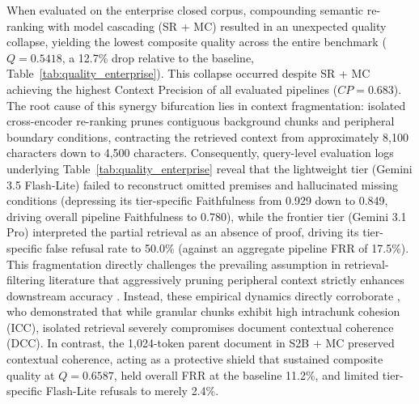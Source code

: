 When evaluated on the enterprise closed corpus, compounding semantic re-ranking with model cascading (SR + MC) resulted in an unexpected quality collapse, yielding the lowest composite quality across the entire benchmark ($Q = 0.5418$, a 12.7\% drop relative to the baseline, Table~\ref{tab:quality_enterprise}). This collapse occurred despite SR + MC achieving the highest Context Precision of all evaluated pipelines ($CP = 0.683$). The root cause of this synergy bifurcation lies in context fragmentation: isolated cross-encoder re-ranking prunes contiguous background chunks and peripheral boundary conditions, contracting the retrieved context from approximately 8,100 characters down to 4,500 characters. Consequently, query-level evaluation logs underlying Table~\ref{tab:quality_enterprise} reveal that the lightweight tier (Gemini 3.5 Flash-Lite) failed to reconstruct omitted premises and hallucinated missing conditions (depressing its tier-specific Faithfulness from 0.929 down to 0.849, driving overall pipeline Faithfulness to 0.780), while the frontier tier (Gemini 3.1 Pro) interpreted the partial retrieval as an absence of proof, driving its tier-specific false refusal rate to 50.0\% (against an aggregate pipeline FRR of 17.5\%). This fragmentation directly challenges the prevailing assumption in retrieval-filtering literature that aggressively pruning peripheral context strictly enhances downstream accuracy \citep{wang2025infogain, yu2024rankrag}. Instead, these empirical dynamics directly corroborate \citet{demourajunior2026adaptive}, who demonstrated that while granular chunks exhibit high intrachunk cohesion (ICC), isolated retrieval severely compromises document contextual coherence (DCC). In contrast, the 1,024-token parent document in S2B + MC preserved contextual coherence, acting as a protective shield that sustained composite quality at $Q = 0.6587$, held overall FRR at the baseline 11.2\%, and limited tier-specific Flash-Lite refusals to merely 2.4\%.

